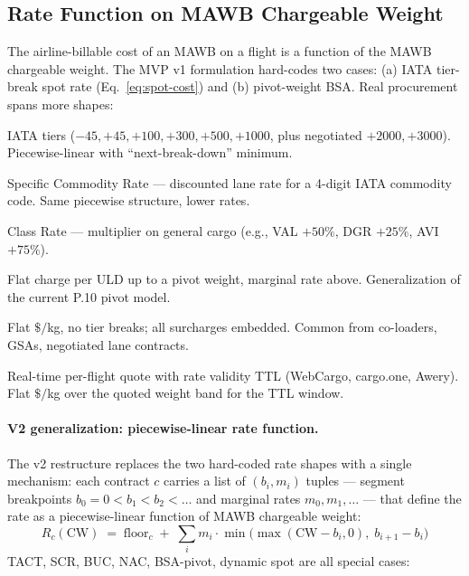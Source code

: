 \documentclass[11pt,a4paper]{article}
\theoremstyle{definition}
\begin{document}
\subsection{Rate Function on MAWB Chargeable Weight}
\label{sec:rate-function}

The airline-billable cost of an MAWB on a flight is a function of the MAWB
chargeable weight. The MVP v1 formulation hard-codes two cases: (a) IATA tier-break
spot rate (Eq.~\ref{eq:spot-cost}) and (b) pivot-weight BSA. Real procurement spans
more shapes:

\begin{description}[leftmargin=2.3cm, labelwidth=2.1cm, style=nextline]
  \item[TACT] IATA tiers (\(-45, +45, +100, +300, +500, +1000\), plus negotiated
        \(+2000, +3000\)). Piecewise-linear with ``next-break-down'' minimum.
  \item[SCR] Specific Commodity Rate — discounted lane rate for a 4-digit IATA
        commodity code. Same piecewise structure, lower rates.
  \item[CCR] Class Rate — multiplier on general cargo (e.g., VAL \(+50\%\),
        DGR \(+25\%\), AVI \(+75\%\)).
  \item[BUC / Pivot] Flat charge per ULD up to a pivot weight, marginal rate above.
        Generalization of the current P.10 pivot model.
  \item[NAC / Block Rate] Flat \(\$/\)kg, no tier breaks; all surcharges embedded.
        Common from co-loaders, GSAs, negotiated lane contracts.
  \item[Dynamic Spot] Real-time per-flight quote with rate validity TTL
        (WebCargo, cargo.one, Awery). Flat \(\$/\)kg over the quoted weight band
        for the TTL window.
\end{description}

\paragraph{V2 generalization: piecewise-linear rate function.}
The v2 restructure replaces the two hard-coded rate shapes with a single
mechanism: each contract \(c\) carries a list of \((b_i, m_i)\) tuples — segment
breakpoints \(b_0 = 0 < b_1 < b_2 < \dots\) and marginal rates \(m_0, m_1, \dots\) —
that define the rate as a piecewise-linear function of MAWB chargeable weight:
\begin{equation}
  R_c(\text{CW}) \;=\; \text{floor}_c \;+\; \sum_i m_i \cdot
    \min\!\bigl(\max(\text{CW} - b_i, 0),\; b_{i+1} - b_i\bigr)
  \label{eq:rate-fn}
\end{equation}
TACT, SCR, BUC, NAC, BSA-pivot, dynamic spot are all special cases:
\end{document}

